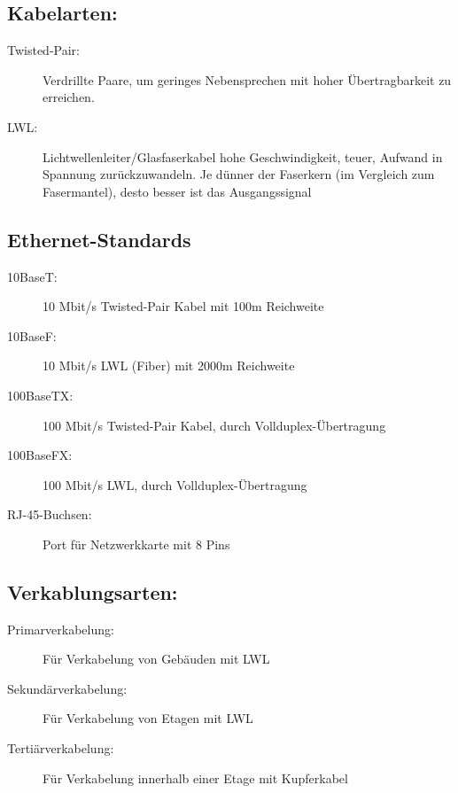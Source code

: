\documentclass[12pt,a4paper]{article}
\begin{document}
		\subsection{Kabelarten:}
		\begin{description}
			\item[Twisted-Pair: ] Verdrillte Paare, um geringes Nebensprechen mit hoher Übertragbarkeit zu erreichen.
			\item[LWL: ] Lichtwellenleiter/Glasfaserkabel hohe Geschwindigkeit, teuer, Aufwand in Spannung zurückzuwandeln. Je dünner der Faserkern (im Vergleich zum Fasermantel), desto besser ist das Ausgangssignal
		\end{description}

		\subsection{Ethernet-Standards}
		\begin{description}
			\item[10BaseT: ] 10 Mbit/s Twisted-Pair Kabel mit 100m Reichweite
			\item[10BaseF: ] 10 Mbit/s LWL (Fiber) mit 2000m Reichweite 
			\item[100BaseTX: ] 100 Mbit/s Twisted-Pair Kabel, durch Vollduplex-Übertragung
			\item[100BaseFX: ]  100 Mbit/s LWL, durch Vollduplex-Übertragung
			\item[RJ-45-Buchsen: ] Port für Netzwerkkarte mit 8 Pins
		\end{description}

		\subsection{Verkablungsarten:}
		\begin{description}
			\item[Primarverkabelung: ] Für Verkabelung von Gebäuden mit LWL
			\item[Sekundärverkabelung: ] Für Verkabelung von Etagen mit LWL
			\item[Tertiärverkabelung: ] Für Verkabelung innerhalb einer Etage mit Kupferkabel
		\end{description}
\end{document}
